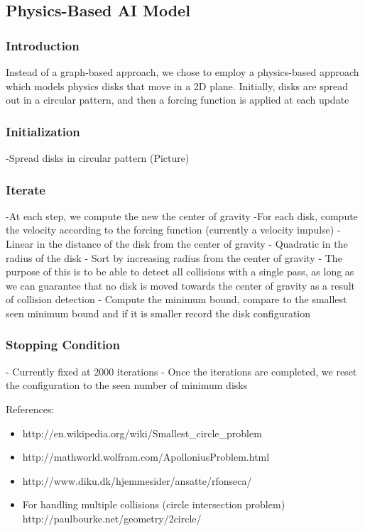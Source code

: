 \documentclass[a4paper]{article}
\begin{document}
\subsection{Physics-Based AI Model}

\subsubsection*{Introduction}

Instead of a graph-based approach, we chose to employ a physics-based approach which models physics disks that move in a 2D plane.  Initially, disks are spread out in a circular pattern, and then a forcing function is applied at each update  

\subsubsection*{Initialization}
-Spread disks in circular pattern
(Picture)

\subsubsection*{Iterate}

-At each step, we compute the new the center of gravity
-For each disk, compute the velocity according to the forcing function (currently a velocity impulse)
  - Linear in the distance of the disk from the center of gravity
  - Quadratic in the radius of the disk
- Sort by increasing radius from the center of gravity
  - The purpose of this is to be able to detect all collisions with a single pass, as long as we can guarantee that no disk is moved towards the center of gravity as a result of collision detection
 - Compute the minimum bound, compare to the smallest seen minimum bound and if it is smaller record the disk configuration
  
\subsubsection*{Stopping Condition}
 - Currently fixed at 2000 iterations
  - Once the iterations are completed, we reset the configuration to the seen number of minimum disks
  
  





References:
\begin{itemize}
\itemsep0em
	\item http://en.wikipedia.org/wiki/Smallest\_circle\_problem
	\item http://mathworld.wolfram.com/ApolloniusProblem.html
	\item http://www.diku.dk/hjemmesider/ansatte/rfonseca/
	\item For handling multiple collisions (circle intersection problem) http://paulbourke.net/geometry/2circle/
\end{itemize}
\end{document}
